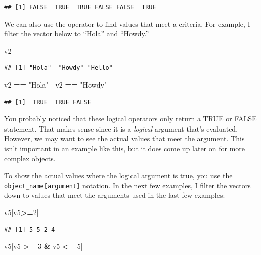 \documentclass[
]{book}
\newenvironment{Shaded}{\begin{snugshade}}{\end{snugshade}}
\newcommand{\DecValTok}[1]{\textcolor[rgb]{0.00,0.00,0.81}{#1}}
\newcommand{\NormalTok}[1]{#1}
\newcommand{\OperatorTok}[1]{\textcolor[rgb]{0.81,0.36,0.00}{\textbf{#1}}}
\newcommand{\StringTok}[1]{\textcolor[rgb]{0.31,0.60,0.02}{#1}}
\begin{document}
\begin{verbatim}
## [1] FALSE  TRUE  TRUE FALSE FALSE  TRUE
\end{verbatim}

We can also use the \texttt{\textbar{}} operator to find values that meet a criteria. For example, I filter the vector below to ``Hola'' and ``Howdy.''

\begin{Shaded}
\begin{Highlighting}[]
\NormalTok{v2}
\end{Highlighting}
\end{Shaded}

\begin{verbatim}
## [1] "Hola"  "Howdy" "Hello"
\end{verbatim}

\begin{Shaded}
\begin{Highlighting}[]
\NormalTok{v2 }\OperatorTok{==}\StringTok{ "Hola"} \OperatorTok{|}\StringTok{ }\NormalTok{v2 }\OperatorTok{==}\StringTok{ "Howdy"}
\end{Highlighting}
\end{Shaded}

\begin{verbatim}
## [1]  TRUE  TRUE FALSE
\end{verbatim}

You probably noticed that these logical operators only return a TRUE or FALSE statement. That makes sense since it is a \emph{logical} argument that's evaluated. However, we may want to see the actual values that meet the argument. This isn't important in an example like this, but it does come up later on for more complex objects.

To show the actual values where the logical argument is true, you use the \texttt{object\_name{[}argument{]}} notation. In the next few examples, I filter the vectors down to values that meet the arguments used in the last few examples:

\begin{Shaded}
\begin{Highlighting}[]
\NormalTok{v5[v5}\OperatorTok{>=}\DecValTok{2}\NormalTok{]}
\end{Highlighting}
\end{Shaded}

\begin{verbatim}
## [1] 5 5 2 4
\end{verbatim}

\begin{Shaded}
\begin{Highlighting}[]
\NormalTok{v5[v5 }\OperatorTok{>=}\StringTok{ }\DecValTok{3} \OperatorTok{&}\StringTok{ }\NormalTok{v5 }\OperatorTok{<=}\StringTok{ }\DecValTok{5}\NormalTok{]}
\end{Highlighting}
\end{Shaded}
\end{document}
